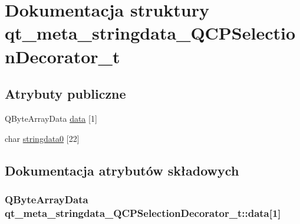 \hypertarget{structqt__meta__stringdata___q_c_p_selection_decorator__t}{}\section{Dokumentacja struktury qt\+\_\+meta\+\_\+stringdata\+\_\+\+Q\+C\+P\+Selection\+Decorator\+\_\+t}
\label{structqt__meta__stringdata___q_c_p_selection_decorator__t}
\subsection*{Atrybuty publiczne}
\begin{DoxyCompactItemize}
\item 
Q\+Byte\+Array\+Data \hyperlink{structqt__meta__stringdata___q_c_p_selection_decorator__t_a1afefbcc9caf562bf85a48bef4fdd12a}{data} \mbox{[}1\mbox{]}
\item 
char \hyperlink{structqt__meta__stringdata___q_c_p_selection_decorator__t_a396f24ff22a1439774cf0634b5080197}{stringdata0} \mbox{[}22\mbox{]}
\end{DoxyCompactItemize}


\subsection{Dokumentacja atrybutów składowych}
\subsubsection[{\texorpdfstring{data}{data}}]{\setlength{\rightskip}{0pt plus 5cm}Q\+Byte\+Array\+Data qt\+\_\+meta\+\_\+stringdata\+\_\+\+Q\+C\+P\+Selection\+Decorator\+\_\+t\+::data\mbox{[}1\mbox{]}}\hypertarget{structqt__meta__stringdata___q_c_p_selection_decorator__t_a1afefbcc9caf562bf85a48bef4fdd12a}{}\label{structqt__meta__stringdata___q_c_p_selection_decorator__t_a1afefbcc9caf562bf85a48bef4fdd12a}

